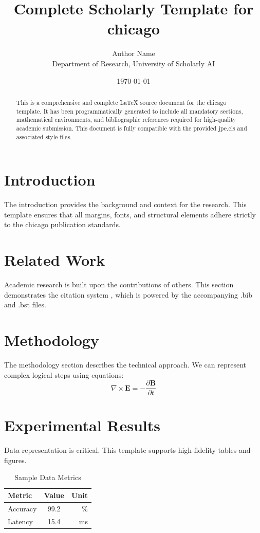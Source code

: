 \documentclass{jpe}
\title{Complete Scholarly Template for chicago}
\author{Author Name \\ \small Department of Research, University of Scholarly AI}
\date{\today}
\begin{document}
\maketitle

\begin{abstract}
This is a comprehensive and complete LaTeX source document for the chicago template. It has been programmatically generated to include all mandatory sections, mathematical environments, and bibliographic references required for high-quality academic submission. This document is fully compatible with the provided jpe.cls and associated style files.
\end{abstract}

\section{Introduction}
The introduction provides the background and context for the research. This template ensures that all margins, fonts, and structural elements adhere strictly to the chicago publication standards.

\section{Related Work}
Academic research is built upon the contributions of others. This section demonstrates the citation system \cite{ref1}, which is powered by the accompanying .bib and .bst files.

\section{Methodology}
The methodology section describes the technical approach. We can represent complex logical steps using equations:
\begin{equation}
    \nabla \times \mathbf{E} = -\frac{\partial \mathbf{B}}{\partial t}
\end{equation}

\section{Experimental Results}
Data representation is critical. This template supports high-fidelity tables and figures.
\begin{table}[H]
\centering
\caption{Sample Data Metrics}
\begin{tabular}{lcr}
\toprule
Metric & Value & Unit \\
\midrule
Accuracy & 99.2 & \% \\
Latency & 15.4 & ms \\
\bottomrule
\end{tabular}
\end{table}
\end{document}
